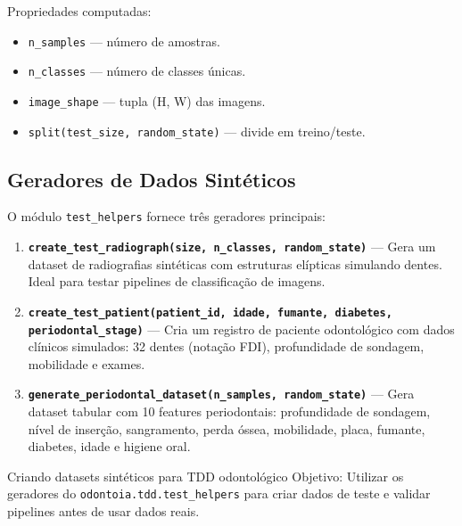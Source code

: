 Propriedades computadas:
\begin{itemize}
  \item \texttt{n\_samples} — número de amostras.
  \item \texttt{n\_classes} — número de classes únicas.
  \item \texttt{image\_shape} — tupla (H, W) das imagens.
  \item \texttt{split(test\_size, random\_state)} — divide em treino/teste.
\end{itemize}

\subsection{Geradores de Dados Sintéticos}

O módulo \texttt{test\_helpers} fornece três geradores principais:

\begin{enumerate}
  \item \textbf{\texttt{create\_test\_radiograph(size, n\_classes, random\_state)}}
    — Gera um dataset de radiografias sintéticas com estruturas elípticas
    simulando dentes. Ideal para testar pipelines de classificação de imagens.

  \item \textbf{\texttt{create\_test\_patient(patient\_id, idade, fumante, diabetes, periodontal\_stage)}}
    — Cria um registro de paciente odontológico com dados clínicos simulados:
    32 dentes (notação FDI), profundidade de sondagem, mobilidade e exames.

  \item \textbf{\texttt{generate\_periodontal\_dataset(n\_samples, random\_state)}}
    — Gera dataset tabular com 10 features periodontais: profundidade de
    sondagem, nível de inserção, sangramento, perda óssea, mobilidade, placa,
    fumante, diabetes, idade e higiene oral.
\end{enumerate}

\begin{pratica}{Criando datasets sintéticos para TDD odontológico}
  Objetivo: Utilizar os geradores do \texttt{odontoia.tdd.test\_helpers}
  para criar dados de teste e validar pipelines antes de usar dados reais.
\end{pratica}


